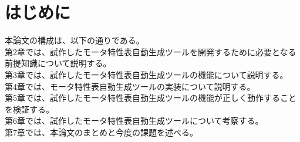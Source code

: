 \chapter{はじめに}\label{cha:Introduction}


本論文の構成は、以下の通りである。\\
第2章では、試作したモータ特性表自動生成ツールを開発するために必要となる前提知識について説明する。\\
第3章では、試作したモータ特性表自動生成ツールの機能について説明する。\\
第4章では、モータ特性表自動生成ツールの実装について説明する。\\
第5章では、試作したモータ特性表自動生成ツールの機能が正しく動作することを検証する。\\
第6章では、試作したモータ特性表自動生成ツールについて考察する。\\
第7章では、本論文のまとめと今度の課題を述べる。\\
